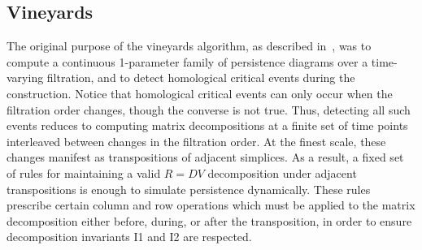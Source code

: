\documentclass{siamart190516}
\begin{document}
\subsection{Vineyards}\label{sec:vineyards}
The original purpose of the vineyards algorithm, as described in~\cite{cohen2006vines}, was to compute a continuous 1-parameter family of persistence diagrams over a time-varying filtration, and to detect homological critical events during the construction.
Notice that homological critical events can only occur when the filtration order changes, though the converse is not true.
Thus, detecting  all such events reduces to computing matrix decompositions at a finite set of time points interleaved between changes in the filtration order. 
At the finest scale, these changes manifest as transpositions of adjacent simplices. 
As a result, a fixed set of rules for maintaining a valid $R = D V$ decomposition under adjacent transpositions  is enough to simulate persistence dynamically. 
These rules prescribe certain column and row operations which must be applied to the matrix decomposition either before, during, or after the transposition, in order to ensure decomposition invariants I1 and I2 are respected.   
\end{document}
